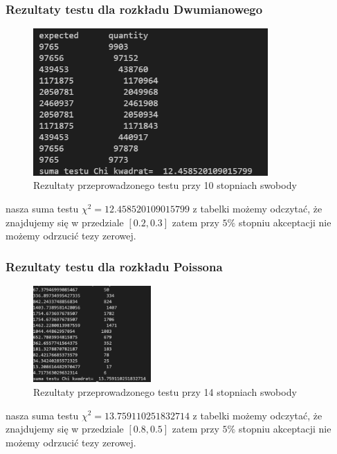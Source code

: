 \documentclass[9pt]{beamer}
\begin{document}
\begin{frame}
  \frametitle{Rezultaty testu dla rozkładu Dwumianowego}
  \begin{figure}[h!]
    \centering
    \includegraphics[width=0.8\textwidth]{assets/dwumian.PNG}
      \caption{Rezultaty przeprowadzonego testu przy 10 stopniach swobody}
  \end{figure}
  nasza suma testu $\chi^2 = 12.458520109015799$ z tabelki możemy odczytać, że znajdujemy się w przedziale $[0.2, 0.3]$ zatem przy $5\%$ stopniu akceptacji nie możemy odrzucić tezy zerowej.
\end{frame}
\begin{frame}
  \frametitle{Rezultaty testu dla rozkładu Poissona}
  \begin{figure}[h!]
    \centering
    \includegraphics[width=0.4\textwidth]{assets/poisson.PNG}
      \caption{Rezultaty przeprowadzonego testu przy 14 stopniach swobody}
  \end{figure}
  nasza suma testu $\chi^2 = 13.759110251832714$ z tabelki możemy odczytać, że znajdujemy się w przedziale $[0.8, 0.5]$ zatem przy $5\%$ stopniu akceptacji nie możemy odrzucić tezy zerowej.
\end{frame}
\end{document}
